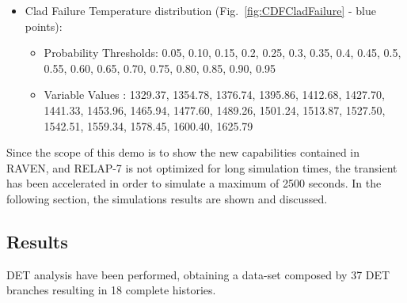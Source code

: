 \begin{itemize}
\begin{itemize}
       \end{itemize}
       \item Clad Failure Temperature distribution (Fig.~\ref{fig:CDFCladFailure} - blue points): 
       \begin{itemize} 
            \item Probability Thresholds: 0.05, 0.10, 0.15, 0.2, 0.25, 0.3, 0.35, 0.4, 0.45, 0.5, 0.55, 0.60, 0.65, 0.70, 0.75, 0.80, 0.85, 0.90, 0.95
            \item Variable Values           : 1329.37, 1354.78, 1376.74, 1395.86, 1412.68, 1427.70, 1441.33, 1453.96, 1465.94, 1477.60, 1489.26, 1501.24, 1513.87, 1527.50, 	1542.51, 1559.34, 1578.45, 1600.40, 1625.79
    \end{itemize}
\end{itemize}
\vspace{-5mm}

Since the scope of this demo is to show the new capabilities contained in RAVEN, and RELAP-7 is not optimized for long simulation times, the transient has been accelerated in order to simulate a maximum of 2500 seconds. 
In the following section, the simulations results are shown and discussed.
\subsection{Results} 
DET analysis have been performed, obtaining a data-set composed by 37 DET branches resulting in 18 complete histories.

